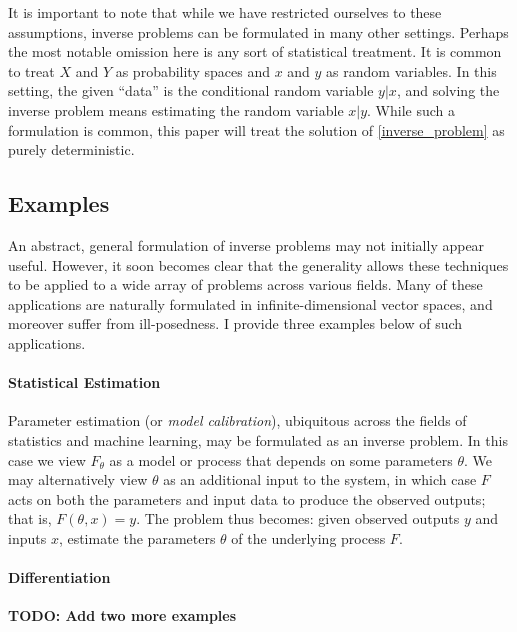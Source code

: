 \documentclass[12pt]{article}
\begin{document}
It is important to note that while we have restricted ourselves to these assumptions, inverse problems can be formulated in many 
other settings. Perhaps the most notable omission here is any sort of statistical treatment. It is common to treat $X$ and $Y$ as
probability spaces and $x$ and $y$ as random variables. In this setting, the given ``data'' is the conditional random variable 
$y|x$, and solving the inverse problem means estimating the random variable $x|y$. While such a formulation is common, this 
paper will treat the solution of \eqref{inverse_problem} as purely deterministic.  

 \subsection{Examples}
 
 An abstract, general formulation of inverse problems may not initially appear useful. 
 However, it soon becomes clear that the generality allows these techniques to be 
 applied to a wide array of problems across various fields. Many of these applications 
 are naturally formulated in infinite-dimensional vector spaces, and moreover suffer from
  ill-posedness. I provide three examples below of such applications. 
 
 \paragraph*{Statistical Estimation}
 Parameter estimation (or \textit{model calibration}), ubiquitous across the fields of statistics 
 and machine learning, may be formulated as an inverse problem. In this case we view 
 $F_\theta$ as a model or process that depends on some parameters $\theta$. We may
  alternatively view $\theta$ as an additional input to the system, in which case $F$ acts 
  on both the parameters and input data to produce the observed outputs; that is, 
  $F(\theta, x) = y$. The problem thus becomes: given observed outputs $y$ and inputs $x$, 
  estimate the parameters $\theta$ of the underlying process $F$. 
  
  \paragraph*{Differentiation}
 
 \textbf{TODO: Add two more examples}
 
\end{document}
